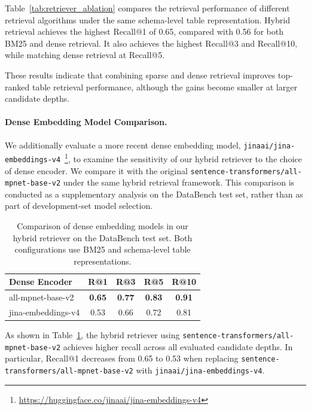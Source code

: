 Table~\ref{tab:retriever_ablation} compares the retrieval performance of different retrieval algorithms under the same schema-level table representation.
Hybrid retrieval achieves the highest Recall@1 of 0.65, compared with 0.56 for both BM25 and dense retrieval. It also achieves the highest Recall@3 and Recall@10, while matching dense retrieval at Recall@5.

These results indicate that combining sparse and dense retrieval improves top-ranked table retrieval performance, although the gains become smaller at larger candidate depths.

\paragraph{Dense Embedding Model Comparison.}

We additionally evaluate a more recent dense embedding model, \texttt{jinaai/jina-embeddings-v4}~\footnote{\url{https://huggingface.co/jinaai/jina-embeddings-v4}}, to examine the sensitivity of our hybrid retriever to the choice of dense encoder.
We compare it with the original \texttt{sentence-transformers/all-mpnet-base-v2} under the same hybrid retrieval framework.
This comparison is conducted as a supplementary analysis on the DataBench test set, rather than as part of development-set model selection.

\begin{table}[t]
\centering
\caption{Comparison of dense embedding models in our hybrid retriever on the DataBench test set. Both configurations use BM25 and schema-level table representations.}
\label{tab:embedding_comparison}
\begin{tabular}{lcccc}
\toprule
\textbf{Dense Encoder} &
\textbf{R@1} &
\textbf{R@3} &
\textbf{R@5} &
\textbf{R@10} \\
\midrule
all-mpnet-base-v2
& \textbf{0.65} & \textbf{0.77} & \textbf{0.83} & \textbf{0.91} \\
jina-embeddings-v4
& 0.53 & 0.66 & 0.72 & 0.81 \\
\bottomrule
\end{tabular}
\end{table}

As shown in Table~\ref{tab:embedding_comparison}, the hybrid retriever using \texttt{sentence-transformers/all-mpnet-base-v2} achieves higher recall across all evaluated candidate depths.
In particular, Recall@1 decreases from 0.65 to 0.53 when replacing \texttt{sentence-transformers/all-mpnet-base-v2} with \texttt{jinaai/jina-embeddings-v4}.

